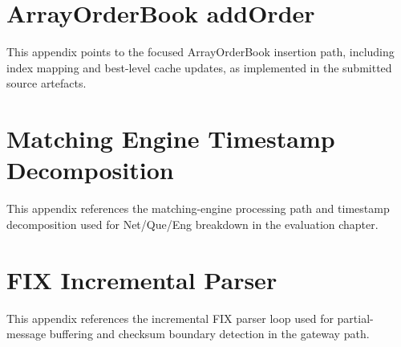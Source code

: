 \documentclass[12pt,a4paper]{report}
\begin{document}
\chapter{ArrayOrderBook addOrder}
This appendix points to the focused ArrayOrderBook insertion path, including index mapping and best-level cache updates, as implemented in the submitted source artefacts.

\chapter{Matching Engine Timestamp Decomposition}
This appendix references the matching-engine processing path and timestamp decomposition used for Net/Que/Eng breakdown in the evaluation chapter.

\chapter{FIX Incremental Parser}
This appendix references the incremental FIX parser loop used for partial-message buffering and checksum boundary detection in the gateway path.
\end{document}
